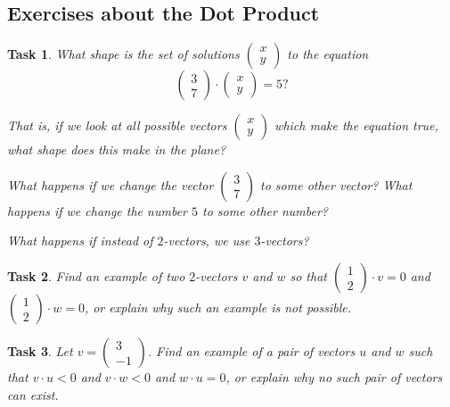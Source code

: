 \documentclass[10pt,]{book}
\theoremstyle{plain}
\numberwithin{equation}{section}
\newtheorem{task}{Task}[chapter]
\begin{document}
\subsection[Exercises about the Dot Product]{Exercises about the Dot Product}\label{subsection-9}
\begin{task}
\label{task-13}
What shape is the set of solutions \(\left(\begin{smallmatrix} x \\ y
        \end{smallmatrix}\right)\) to the equation\[
            \begin{pmatrix} 3 \\ 7\end{pmatrix} \cdot \begin{pmatrix} x \\ y
            \end{pmatrix} = 5?
        \]
\par
That is, if we look at all possible vectors \(\left(\begin{smallmatrix}
          x \\ y \end{smallmatrix}\right)\) which make the equation true, what shape
          does this make in the plane?%
\par
What happens if we change the vector \(\left(\begin{smallmatrix} 3
          \\ 7 \end{smallmatrix}\right)\) to some other vector? What happens
          if we change the number \(5\) to some other number?
\par
What happens if instead of \(2\)-vectors, we use \(3\)-vectors?
\end{task}
\begin{task}
\label{task-14}
Find an example of two \(2\)-vectors \(v\) and \(w\)
      so that \(\left(\begin{smallmatrix}1 \\ 2 \end{smallmatrix}\right)\cdot v
      =0\) and \(\left(\begin{smallmatrix}1 \\ 2 \end{smallmatrix}\right)\cdot
      w = 0\), or explain why such an example is not possible.
      \end{task}
\begin{task}
\label{task-15}
Let \(v = \left(\begin{smallmatrix}3\\-1
        \end{smallmatrix}\right)\). Find an example of a pair of vectors
        \(u\) and \(w\) such that \(v \cdot u < 0\) and
        \(v \cdot w < 0\) and \(w \cdot u = 0\), or explain why no such
        pair of vectors can exist.
      \end{task}
\end{document}
